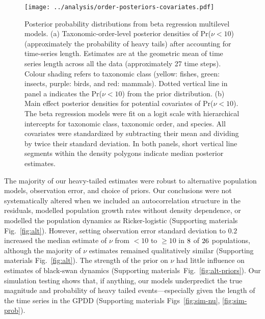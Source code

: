 \begin{figure}[htbp]
\begin{center}
\texttt{[image: ../analysis/order-posteriors-covariates.pdf]}

\caption[Posterior probability distributions from beta regression multilevel
  models.]{Posterior probability distributions from beta regression multilevel
  models. (a) Taxonomic-order-level posterior densities of Pr($\nu < 10$)
  (approximately the probability of heavy tails) after accounting for
  time-series length. Estimates are at the geometric mean of time series
  length across all the data (approximately 27 time steps). Colour shading
  refers to taxonomic class (yellow: fishes, green: insects, purple: birds,
  and red: mammals). Dotted vertical line in panel a indicates the
  Pr($\nu < 10$) from the prior distribution. (b) Main effect
  posterior densities for potential covariates of Pr($\nu < 10$). The beta
  regression models were fit on a logit scale with hierarchical intercepts for
  taxonomic class, taxonomic order, and species. All covariates were
  standardized by subtracting their mean and dividing by twice their standard
  deviation. In both panels, short vertical line segments within the density
  polygons indicate median posterior estimates.}

\label{fig:posteriors}
\end{center}
\end{figure}


The majority of our heavy-tailed estimates were robust to alternative
population models, observation error, and choice of priors. Our conclusions
were not systematically altered when we included an autocorrelation structure
in the residuals, modelled population growth rates without density dependence,
or modelled the population dynamics as Ricker-logistic (Supporting materials Fig.~\ref{fig:alt}).
However, setting observation error standard deviation to $0.2$ increased the
median estimate of $\nu$ from $<10$ to $\ge 10$ in $8$ of
$26$ populations, although the majority of $\nu$ estimates remained
qualitatively similar (Supporting materials Fig.~\ref{fig:alt}). The strength of the prior on $\nu$
had little influence on estimates of black-swan dynamics
(Supporting materials~Fig.~\ref{fig:alt-priors}). Our simulation testing shows that, if anything,
our models underpredict the true magnitude and probability of heavy tailed
events---especially given the length of the time series in the GPDD
(Supporting materials Figs~\ref{fig:sim-nu}, \ref{fig:sim-prob}).

